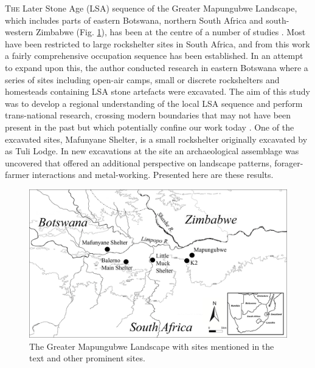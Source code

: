 	
	\lettrine[nindent=0em,lines=3]{T}{he} Later Stone Age (LSA) sequence of the Greater Mapungubwe Landscape, which includes parts of eastern Botswana, northern South Africa and south-western Zimbabwe (Fig. \ref{fig:Forssmann-Figure01}), has been at the centre of a number of studies \parencites[e.g.][]{Hall_2000}{vanDoornum_2005}{vanDoornum_2007}{vanDoornum_2008}{vanDoornum_2014}{Forssman_2010}{Forssman_2013a}{Forssman_2013b}{Forssman_2013c}{Forssman_2014a}{Forssman_2014b}. Most have been restricted to large rockshelter sites in South Africa, and from this work a fairly comprehensive occupation sequence has been established. In an attempt to expand upon this, the author conducted research in eastern Botswana where a series of sites including open-air camps, small or discrete rockshelters and homesteads containing LSA stone artefacts were excavated. The aim of this study was to develop a regional understanding of the local LSA sequence and perform trans-national research, crossing modern boundaries that may not have been present in the past but which potentially confine our work today \parencites[for details see][]{Forssman_2013c}{Forssman_2014a}{Forssman_2014b}{Forssman_2015}. One of the excavated sites, Mafunyane Shelter, is a small rockshelter originally excavated by \textcite{Walker_1994} as Tuli Lodge. In new excavations at the site an archaeological assemblage was uncovered that offered an additional perspective on landscape patterns, forager-farmer interactions and metal-working. Presented here are these results.
	
\begin{figure}
		\includegraphics[width=\linewidth]{figures/Forssman-Figure01}
		\caption{The Greater Mapungubwe Landscape with sites mentioned in the text and other prominent sites.}
		\label{fig:Forssmann-Figure01}
\end{figure}
	
